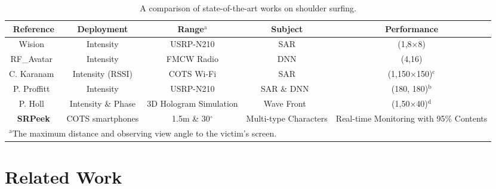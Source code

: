 \begin{table*}[t]
    \caption{A comparison of state-of-the-art works on shoulder surfing.}
    \vspace{2mm}
    \begin{center}
    \begin{tabular}{ccccc}
    \hline
     Reference & Deployment & Range$^{\mathrm{a}}$ & Subject & Performance\\ 
    \hline
    Wision~\cite{wision}  & Intensity & USRP-N210 & SAR & (1,8$\times$8)\\ 
    RF\_Avatar~\cite{rf_avatar}  & Intensity & FMCW Radio & DNN & (4,16)\\ 
    C. Karanam~\cite{3dimaging_uav} & Intensity (RSSI) & COTS Wi-Fi & SAR & (1,150$\times$150)$^{\mathrm{c}}$\\ 
    P. Proffitt~\cite{imaging_1} & Intensity & USRP-N210 & SAR \& DNN~\cite{MaskRCNN} & (180, 180)$^{\mathrm{b}}$\\ 
    P. Holl~\cite{holography} & Intensity \& Phase & 3D Hologram Simulation & Wave Front~\cite{angular} & (1,50$\times$40)$^{\mathrm{d}}$\\ 
    \hline
    \textbf{\textsf{SRPeek}} & COTS smartphones & 1.5m \& 30$^\circ$ & Multi-type Characters & Real-time Monitoring with 95\% Contents\\
    \hline
    \multicolumn{5}{l}{$^{\mathrm{a}}$The maximum distance and observing view angle to the victim's screen.}\\
    \end{tabular}
    \label{tbl:comparison}
    \end{center}
\end{table*}

\section{Related Work}
\label{sec-related-work}
